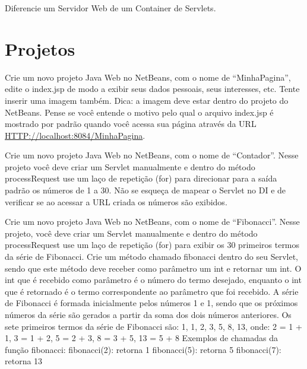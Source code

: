 \begin{exercicioSemArquivo}{}{}{}
    Diferencie um Servidor Web de um Container de Servlets.
\end{exercicioSemArquivo}


\section{Projetos}

\begin{projetoSemArquivo}{}{}{}
    Crie um novo projeto Java Web no NetBeans, com o nome de ``MinhaPagina'', edite o index.jsp de modo a exibir seus dados pessoais, seus interesses, etc. Tente inserir uma imagem também. Dica: a imagem deve estar dentro do projeto do NetBeans. Pense se você entende o motivo pelo qual o arquivo index.jsp é mostrado por padrão quando você acessa sua página através da URL \url{HTTP://localhost:8084/MinhaPagina}.
\end{projetoSemArquivo}

\begin{projetoSemArquivo}{}{}{}
    Crie um novo projeto Java Web no NetBeans, com o nome de ``Contador''. Nesse projeto você deve criar um Servlet manualmente e dentro do método processRequest use um laço de repetição (for) para direcionar para a saída padrão os números de 1 a 30. Não se esqueça de mapear o Servlet no DI e de verificar se ao acessar a URL criada os números são exibidos.
\end{projetoSemArquivo}

\begin{projetoSemArquivo}{}{}{}
    Crie um novo projeto Java Web no NetBeans, com o nome de ``Fibonacci''. Nesse projeto, você deve criar um Servlet manualmente e dentro do método processRequest use um laço de repetição (for) para exibir os 30 primeiros termos da série de Fibonacci. Crie um método chamado fibonacci dentro do seu Servlet, sendo que este método deve receber como parâmetro um int e retornar um int. O int que é recebido como parâmetro é o número do termo desejado, enquanto o int que é retornado é o termo correspondente ao parâmetro que foi recebido. A série de Fibonacci é formada inicialmente pelos números 1 e 1, sendo que os próximos números da série são gerados a partir da soma dos dois números anteriores. Os sete primeiros termos da série de Fibonacci são:
    1, 1, 2, 3, 5, 8, 13, onde: 2 = 1 + 1, 3 = 1 + 2, 5 = 2 + 3, 8 = 3 + 5, 13 = 5 + 8
    Exemplos de chamadas da função fibonacci:
    fibonacci(2): retorna 1
    fibonacci(5): retorna 5
    fibonacci(7): retorna 13
\end{projetoSemArquivo}